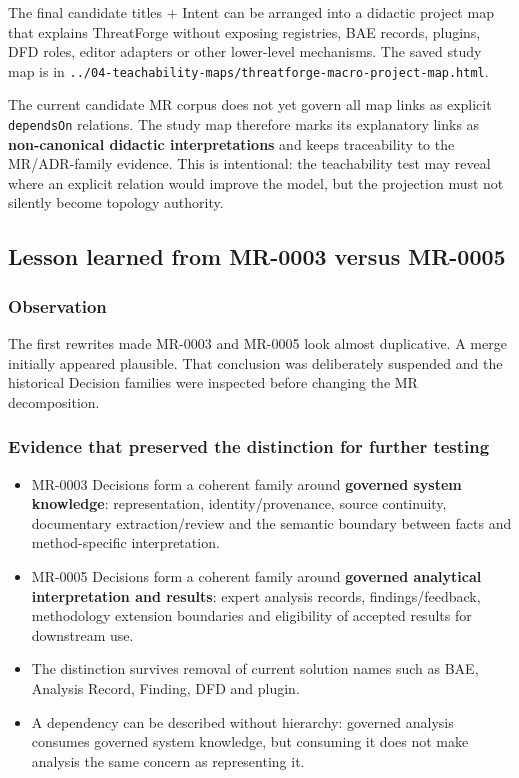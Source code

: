 \documentclass[
  10pt,
]{article}
\providecommand{\tightlist}{%
  \setlength{\itemsep}{0pt}\setlength{\parskip}{0pt}}
\begin{document}
The final candidate titles + Intent can be arranged into a didactic
project map that explains ThreatForge without exposing registries, BAE
records, plugins, DFD roles, editor adapters or other lower-level
mechanisms. The saved study map is in
\texttt{../04-teachability-maps/threatforge-macro-project-map.html}.

The current candidate MR corpus does not yet govern all map links as
explicit \texttt{dependsOn} relations. The study map therefore marks its
explanatory links as \textbf{non-canonical didactic interpretations} and
keeps traceability to the MR/ADR-family evidence. This is intentional:
the teachability test may reveal where an explicit relation would
improve the model, but the projection must not silently become topology
authority.

\subsection{Lesson learned from MR-0003 versus
MR-0005}\label{lesson-learned-from-mr-0003-versus-mr-0005}

\subsubsection{Observation}\label{observation}

The first rewrites made MR-0003 and MR-0005 look almost duplicative. A
merge initially appeared plausible. That conclusion was deliberately
suspended and the historical Decision families were inspected before
changing the MR decomposition.

\subsubsection{Evidence that preserved the distinction for further
testing}\label{evidence-that-preserved-the-distinction-for-further-testing}

\begin{itemize}
\tightlist
\item
  MR-0003 Decisions form a coherent family around \textbf{governed
  system knowledge}: representation, identity/provenance, source
  continuity, documentary extraction/review and the semantic boundary
  between facts and method-specific interpretation.
\item
  MR-0005 Decisions form a coherent family around \textbf{governed
  analytical interpretation and results}: expert analysis records,
  findings/feedback, methodology extension boundaries and eligibility of
  accepted results for downstream use.
\item
  The distinction survives removal of current solution names such as
  BAE, Analysis Record, Finding, DFD and plugin.
\item
  A dependency can be described without hierarchy: governed analysis
  consumes governed system knowledge, but consuming it does not make
  analysis the same concern as representing it.
\end{itemize}
\end{document}
